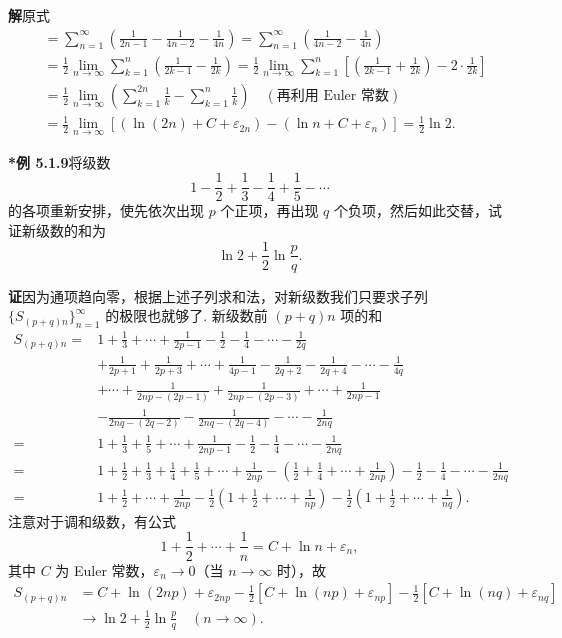 \documentclass[UTF8, 12pt, fontset=fandol, oneside]{ctexart}
\begin{document}
\noindent\textbf{解}\quad 原式
\[
\begin{aligned}
&=\sum_{n=1}^\infty\left(\frac1{2n-1}-\frac1{4n-2}-\frac1{4n}\right)
=\sum_{n=1}^\infty\left(\frac1{4n-2}-\frac1{4n}\right)\\
&=\frac12\lim_{n\to\infty}\sum_{k=1}^n\left(\frac1{2k-1}-\frac1{2k}\right)
=\frac12\lim_{n\to\infty}\sum_{k=1}^n\left[\left(\frac1{2k-1}+\frac1{2k}\right)-2\cdot\frac1{2k}\right]\\
&=\frac12\lim_{n\to\infty}\left(\sum_{k=1}^{2n}\frac1k-\sum_{k=1}^n\frac1k\right)\quad(\text{再利用 Euler 常数})\\
&=\frac12\lim_{n\to\infty}\left[(\ln(2n)+C+\varepsilon_{2n})-(\ln n+C+\varepsilon_n)\right]
=\frac12\ln2.
\end{aligned}
\]

\noindent\textbf{*例 5.1.9}\quad 将级数
\[
  1-\frac12+\frac13-\frac14+\frac15-\cdots
\]
的各项重新安排，使先依次出现 $p$ 个正项，再出现 $q$ 个负项，然后如此交替，试证新级数的和为
\[
  \ln2+\frac12\ln\frac pq.
\]

\noindent\textbf{证}\quad 因为通项趋向零，根据上述子列求和法，对新级数我们只要求子列 $\{S_{(p+q)n}\}_{n=1}^\infty$ 的极限也就够了. 新级数前 $(p+q)n$ 项的和
\[
\begin{aligned}
S_{(p+q)n}
={}&1+\frac13+\cdots+\frac1{2p-1}-\frac12-\frac14-\cdots-\frac1{2q}\\
&+\frac1{2p+1}+\frac1{2p+3}+\cdots+\frac1{4p-1}
  -\frac1{2q+2}-\frac1{2q+4}-\cdots-\frac1{4q}\\
&+\cdots+\frac1{2np-(2p-1)}+\frac1{2np-(2p-3)}+\cdots+\frac1{2np-1}\\
&-\frac1{2nq-(2q-2)}-\frac1{2nq-(2q-4)}-\cdots-\frac1{2nq}\\
={}&1+\frac13+\frac15+\cdots+\frac1{2np-1}
  -\frac12-\frac14-\cdots-\frac1{2nq}\\
={}&1+\frac12+\frac13+\frac14+\frac15+\cdots+\frac1{2np}
  -\left(\frac12+\frac14+\cdots+\frac1{2np}\right)
  -\frac12-\frac14-\cdots-\frac1{2nq}\\
={}&1+\frac12+\cdots+\frac1{2np}
  -\frac12\left(1+\frac12+\cdots+\frac1{np}\right)
  -\frac12\left(1+\frac12+\cdots+\frac1{nq}\right).
\end{aligned}
\]
注意对于调和级数，有公式
\[
  1+\frac12+\cdots+\frac1n=C+\ln n+\varepsilon_n,
\]
其中 $C$ 为 Euler 常数，$\varepsilon_n\to0$（当 $n\to\infty$ 时），故
\[
\begin{aligned}
S_{(p+q)n}
&=C+\ln(2np)+\varepsilon_{2np}
 -\frac12[C+\ln(np)+\varepsilon_{np}]
 -\frac12[C+\ln(nq)+\varepsilon_{nq}]\\
&\to \ln2+\frac12\ln\frac pq\quad(n\to\infty).
\end{aligned}
\]
\end{document}
